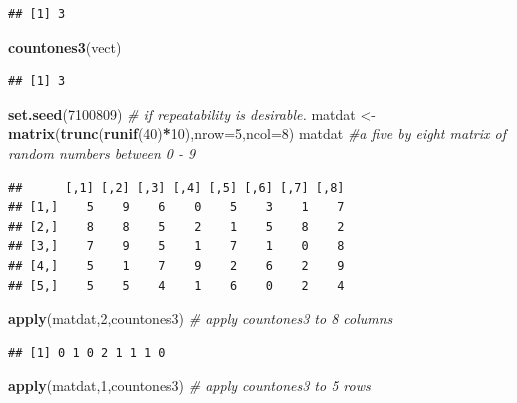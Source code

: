 \documentclass[
  lang=cn,
  11pt,
  scheme=chinese,
  chinesefont=nofont,
  citestyle=gb7714-2015,
  bibstyle=gb7714-2015]{elegantbook}
\newenvironment{Shaded}{\begin{snugshade}}{\end{snugshade}}
\newcommand{\AttributeTok}[1]{\textcolor[rgb]{0.13,0.29,0.53}{#1}}
\newcommand{\CommentTok}[1]{\textcolor[rgb]{0.56,0.35,0.01}{\textit{#1}}}
\newcommand{\DecValTok}[1]{\textcolor[rgb]{0.00,0.00,0.81}{#1}}
\newcommand{\FunctionTok}[1]{\textcolor[rgb]{0.13,0.29,0.53}{\textbf{#1}}}
\newcommand{\NormalTok}[1]{#1}
\newcommand{\OtherTok}[1]{\textcolor[rgb]{0.56,0.35,0.01}{#1}}
\newcommand{\SpecialCharTok}[1]{\textcolor[rgb]{0.81,0.36,0.00}{\textbf{#1}}}
\begin{document}
\begin{verbatim}
## [1] 3
\end{verbatim}

\begin{Shaded}
\begin{Highlighting}[]
\FunctionTok{countones3}\NormalTok{(vect)  }
\end{Highlighting}
\end{Shaded}

\begin{verbatim}
## [1] 3
\end{verbatim}

\begin{Shaded}
\begin{Highlighting}[]
\FunctionTok{set.seed}\NormalTok{(}\DecValTok{7100809}\NormalTok{) }\CommentTok{\# if repeatability is desirable.   }
\NormalTok{matdat }\OtherTok{\textless{}{-}} \FunctionTok{matrix}\NormalTok{(}\FunctionTok{trunc}\NormalTok{(}\FunctionTok{runif}\NormalTok{(}\DecValTok{40}\NormalTok{)}\SpecialCharTok{*}\DecValTok{10}\NormalTok{),}\AttributeTok{nrow=}\DecValTok{5}\NormalTok{,}\AttributeTok{ncol=}\DecValTok{8}\NormalTok{)  }
\NormalTok{matdat }\CommentTok{\#a five by eight matrix of random numbers between 0 {-} 9  }
\end{Highlighting}
\end{Shaded}

\begin{verbatim}
##      [,1] [,2] [,3] [,4] [,5] [,6] [,7] [,8]
## [1,]    5    9    6    0    5    3    1    7
## [2,]    8    8    5    2    1    5    8    2
## [3,]    7    9    5    1    7    1    0    8
## [4,]    5    1    7    9    2    6    2    9
## [5,]    5    5    4    1    6    0    2    4
\end{verbatim}

\begin{Shaded}
\begin{Highlighting}[]
\FunctionTok{apply}\NormalTok{(matdat,}\DecValTok{2}\NormalTok{,countones3)  }\CommentTok{\# apply countones3 to 8 columns  }
\end{Highlighting}
\end{Shaded}

\begin{verbatim}
## [1] 0 1 0 2 1 1 1 0
\end{verbatim}

\begin{Shaded}
\begin{Highlighting}[]
\FunctionTok{apply}\NormalTok{(matdat,}\DecValTok{1}\NormalTok{,countones3)  }\CommentTok{\# apply countones3 to 5 rows  }
\end{Highlighting}
\end{Shaded}
\end{document}
